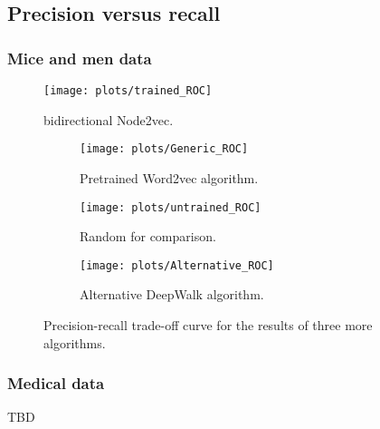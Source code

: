 \documentclass{article}
\begin{document}
 \subsection{Precision versus recall}
  \subsubsection{Mice and men data}
  \begin{figure}[H]
   \centering
   \texttt{[image: plots/trained\_ROC]}
   \caption[Precision-recall curve trained mice model]{bidirectional Node2vec.}
   \label{ROC_trained}
  \end{figure}
 
 
  \begin{figure}[H]
   \centering
  
 \begin{subfigure}{.3\textwidth}
   \centering
   \texttt{[image: plots/Generic\_ROC]}
   \caption[Precision-recall curve pre-trained mice]{Pretrained Word2vec algorithm.}
   \label{ROC_generic}
   \end{subfigure}
 \begin{subfigure}{.3\textwidth}
   \centering\texttt{[image: plots/untrained\_ROC]}
   \caption[Precision-recall curve untrained mice]{Random for comparison.}
   \label{ROC_untrained}
  \end{subfigure}
 \begin{subfigure}{.3\textwidth}
   \centering
   \texttt{[image: plots/Alternative\_ROC]}
   \caption[Precision-recall curve DeepWalk mice]{Alternative DeepWalk algorithm.}
   \label{ROC_alternative}
  \end{subfigure}
  \caption[Three more precision-recall curves]{Precision-recall trade-off curve for the results of three more algorithms.}
  \end{figure}
   \subsubsection{Medical data}
   TBD
  
\end{document}
